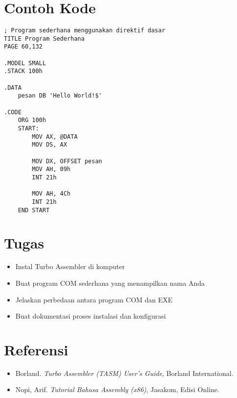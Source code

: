 \section{Contoh Kode}
\begin{verbatim}
; Program sederhana menggunakan direktif dasar
TITLE Program Sederhana
PAGE 60,132

.MODEL SMALL
.STACK 100h

.DATA
    pesan DB 'Hello World!$'

.CODE
    ORG 100h
    START:
        MOV AX, @DATA
        MOV DS, AX
        
        MOV DX, OFFSET pesan
        MOV AH, 09h
        INT 21h
        
        MOV AH, 4Ch
        INT 21h
    END START
\end{verbatim}

\section{Tugas}
\begin{itemize}
\item Instal Turbo Assembler di komputer
\item Buat program COM sederhana yang menampilkan nama Anda
\item Jelaskan perbedaan antara program COM dan EXE
\item Buat dokumentasi proses instalasi dan konfigurasi
\end{itemize}

\section{Referensi}
\begin{itemize}
\item Borland. \textit{Turbo Assembler (TASM) User's Guide}, Borland International.
\item Nopi, Arif. \textit{Tutorial Bahasa Assembly (x86)}, Jasakom, Edisi Online.
\end{itemize}

